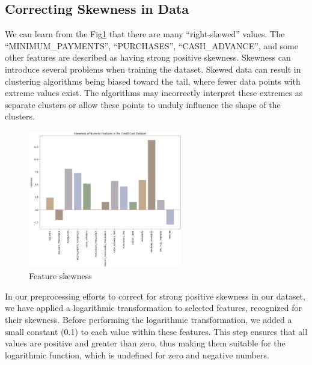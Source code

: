 \documentclass{article}
\begin{document}
\subsection{Correcting Skewness in Data}
We can learn from the Fig\ref{fig:skew} that there are many ``right-skewed'' values. The ``MINIMUM\_PAYMENTS'', ``PURCHASES'', ``CASH\_ADVANCE'', and some other features are described as having strong positive skewness. Skewness can introduce several problems when training the dataset. Skewed data can result in clustering algorithms being biased toward the tail, where fewer data points with extreme values exist. The algorithms may incorrectly interpret these extremes as separate clusters or allow these points to unduly influence the shape of the clusters.
\begin{figure}[hbt!]
    \centering
    \includegraphics[width=0.6\textwidth]{fig/zya/skewness.png}
    \caption{Feature skewness}
    \label{fig:skew}  %
\end{figure}
In our preprocessing efforts to correct for strong positive skewness in our dataset, we have applied a logarithmic transformation to selected features, recognized for their skewness. Before performing the logarithmic transformation, we added a small constant (0.1) to each value within these features. This step ensures that all values are positive and greater than zero, thus making them suitable for the logarithmic function, which is undefined for zero and negative numbers.
\end{document}
